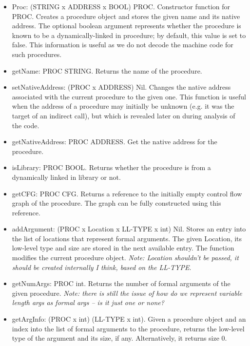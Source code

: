 \begin{itemize}
\item Proc: (STRING x ADDRESS x BOOL) \ra PROC.
    Constructor function for PROC.  Creates a procedure object and 
    stores the given name and its native address.  The optional
    boolean argument represents whether the procedure is known
    to be a dynamically-linked in procedure; by default, this 
    value is set to false.  
    This information is useful as we do not decode the machine 
    code for such procedures.

\item getName: PROC \ra STRING.
    Returns the name of the procedure.

\item setNativeAddress: (PROC x ADDRESS) \ra Nil.
    Changes the native address associated with the current 
    procedure to the given one.
    This function is useful when the address of a procedure
    may initially be unknown (e.g. it was the target of an
    indirect call), but which is revealed later on during
    analysis of the code.

\item getNativeAddress: PROC \ra ADDRESS.
    Get the native address for the procedure.

\item isLibrary: PROC \ra BOOL.
    Returns whether the procedure is from a dynamically linked in 
    library or not.

\item getCFG: PROC \ra CFG.
    Returns a reference to the initially empty control flow graph
    of the procedure.  The graph can be fully constructed using
    this reference.  

\item addArgument: (PROC x Location x LL-TYPE x int) \ra Nil.
    Stores an entry into the list of locations that represent formal
    arguments.  The given Location, its low-level type and size are
    stored in the next available entry.  The function modifies the
    current procedure object. 
    \emph{Note: Location shouldn't be passed, it should be created
    internally I think, based on the LL-TYPE}.

\item getNumArgs: PROC \ra int.
    Returns the number of formal arguments of the given procedure.
    \emph{Note: there is still the issue of how do we represent
    variable length args as formal args -- is it just one or none?}

\item getArgInfo: (PROC x int) \ra (LL-TYPE x int).
    Given a procedure object and an index into the list of formal arguments
    to the procedure, returns the low-level type of the argument and its
    size, if any.  Alternatively, it returns size 0.


\end{itemize}

